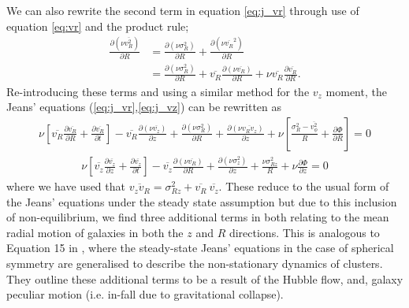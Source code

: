We can also rewrite the second term in equation \ref{eq:j_vr} through use of equation \ref{eq:vr} and the product rule; 
\begin{align}
\frac{\partial ( \nu \overline{v_R^2})}{\partial R} &= \frac{\partial (\nu \sigma^2_R)}{\partial R} + \frac{\partial ( \nu \overline{v_R}^2)}{\partial R} \\
&= \frac{\partial (\nu \sigma^2_R)}{\partial R} +  \overline{v_R}\frac{\partial (\nu \overline{v_R})}{\partial R} + \nu \overline{v_R} \frac{\partial \overline{v_R}}{\partial R}.
\end{align}
Re-introducing these terms and using a similar method for the $v_z$ moment, the Jeans' equations (\ref{eq:j_vr},\ref{eq:j_vz}) can be rewritten as
\begin{multline}
\nu \left[\overline{v_R}\frac{\partial \overline{v_R}}{\partial R} + \frac{\partial \overline{v_R}}{\partial t} \right] - \overline{v_R} \frac{\partial (\nu \overline{v_z})}{\partial z} + \frac{\partial (\nu \sigma_R^2)}{\partial R} + \frac{\partial (\nu \overline{v_R v_z})}{\partial z} + \nu \left[ \frac{\sigma_R^2 - \overline{v_{\phi}^2}}{R} + \frac{\partial \Phi}{\partial R}\right] = 0
\end{multline}
\begin{multline}
\nu \left[\overline{v_z}\frac{\partial \overline{v_z}}{\partial z} + \frac{\partial \overline{v_z}}{\partial t} \right] - \overline{v_z} \frac{\partial (\nu \overline{v_R})}{\partial R} + \frac{\partial (\nu \sigma_z^2)}{\partial z} + \frac{\nu \sigma_{Rz}^2}{R} + \nu \frac{\partial \Phi}{\partial z} = 0 
\end{multline}
where we have used that $\overline{v_z v_R} = \sigma_{Rz}^2 + \overline{v_R} \ \overline{v_z}$. These reduce to the usual form of the Jeans' equations under the steady state assumption but due to this inclusion of non-equilibrium, we find three additional terms in both relating to the mean radial motion of galaxies in both the $z$ and $R$ directions. This is analogous to Equation 15 in \citet{falco2013}, where the steady-state Jeans' equations in the case of spherical symmetry are generalised to describe the non-stationary dynamics of clusters. They outline these additional terms to be a result of the Hubble flow, and, galaxy peculiar motion (i.e. in-fall due to gravitational collapse). 

